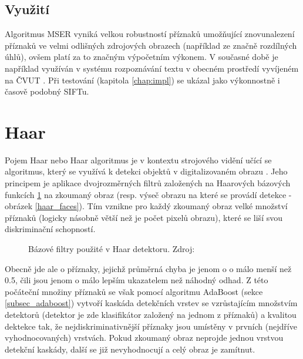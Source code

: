 	\subsection{Využití}
		Algoritmus MSER vyniká velkou robustností příznaků umožňující znovunalezení příznaků ve velmi odlišných zdrojových obrazech (například ze značně rozdílných úhlů), ovšem platí za to značným výpočetním výkonem. V současné době je například využíván v systému rozpoznávání textu v obecném prostředí vyvíjeném na ČVUT \cite{neumann2012real}. Při testování (kapitola \ref{chap:impl}) se ukázal jako výkonnostně i časově podobný SIFTu.
	

\section{Haar}
\label{sec:haar}

	Pojem Haar nebo Haar algoritmus je v kontextu strojového vidění učící se algoritmus, který se využívá k detekci objektů v digitalizovaném obrazu \cite{viola2001rapid}. Jeho principem je aplikace dvojrozměrných filtrů založených na Haarových bázových funkcích \ref{haar_filters} na zkoumaný obraz (resp. výseč obrazu na které se provádí detekce - obrázek \ref{haar_faces}). Tím vznikne pro každý zkoumaný obraz velké množství příznaků (logicky násobně větší než je počet pixelů obrazu), které se liší svou diskriminační schopností. 
	
	\begin{figure}[!ht] 
		\caption{Bázové filtry použité v Haar detektoru. Zdroj: \cite{viola2001rapid}}	\label{haar_filters}
	\end{figure} 
	
	Obecně jde ale o příznaky, jejichž průměrná chyba je jenom o o málo menší než 0.5, čili jsou jenom o málo lepším ukazatelem než náhodný odhad. Z této počáteční množiny příznaků se však pomocí algoritmu AdaBoost (sekce \ref{subsec_adaboost}) vytvoří kaskáda detekčních vrstev se vzrůstajícím množstvím detektorů (detektor je zde klasifikátor založený na jednom z příznaků) a kvalitou dektekce tak, že nejdiskriminativnější příznaky jsou umístěny v prvních (nejdříve vyhodnocovaných) vrstvách. Pokud zkoumaný obraz neprojde jednou vrstvou detekční kaskády, další se již nevyhodnocují a celý obraz je zamítnut. 
	
